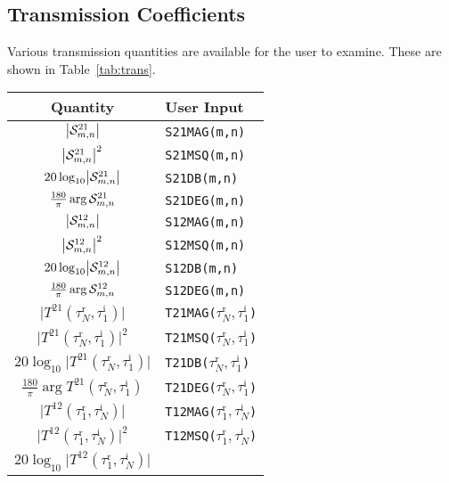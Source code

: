 \documentclass[11pt]{article}
\renewcommand{\inc}{^{\text{i}}}
\renewcommand{\refl}{^{\text{r}}}
\renewcommand{\abs}[1]{\bigl\lvert#1\bigr\rvert}
\begin{document}
\subsection{Transmission Coefficients}

Various transmission quantities are available for the user to examine.
These are shown in Table~\ref{tab:trans}.
\begin{table}[htbp]
  \begin{center}
    \renewcommand{\arraystretch}{1.3}
    \begin{tabular}{|c|l|} \hline
      \bfseries Quantity & \bfseries User Input \\ \hline \hline
      $\abs{\matel{S}^{21}_{m,n}}$ & \verb_S21MAG(m,n)_ \\ \hline
      $\abs{\matel{S}^{21}_{m,n}}^2$ & \verb_S21MSQ(m,n)_ \\ \hline
      $20\log_{10}\abs{\matel{S}^{21}_{m,n}}$ & \verb_S21DB(m,n)_ \\ \hline
      $\frac{180}{\pi}\arg{\mathcal{S}^{21}_{m,n}}$ & \verb_S21DEG(m,n)_
      \\ \hline
      $\abs{\matel{S}^{12}_{m,n}}$ & \verb_S12MAG(m,n)_ \\ \hline
      $\abs{\matel{S}^{12}_{m,n}}^2$ & \verb_S12MSQ(m,n)_ \\ \hline
      $20\log_{10}\abs{\matel{S}^{12}_{m,n}}$ & \verb_S12DB(m,n)_ \\ \hline
      $\frac{180}{\pi}\arg{\mathcal{S}^{12}_{m,n}}$ & \verb_S12DEG(m,n)_
      \\ \hline
      $\abs{T^{21}(\tau_N\refl,\tau_1\inc)}$ & 
        \verb_T21MAG(_$\tau_N\refl,\tau_1\inc$\verb_)_ \\ \hline
      $\abs{T^{21}(\tau_N\refl,\tau_1\inc)}^2$ & 
        \verb_T21MSQ(_$\tau_N\refl,\tau_1\inc$\verb_)_ \\ \hline
      $20\log_{10}\abs{T^{21}(\tau_N\refl,\tau_1\inc)}$ & 
        \verb_T21DB(_$\tau_N\refl,\tau_1\inc$\verb_)_ \\ \hline
      $\frac{180}{\pi}\arg{T^{21}(\tau_N\refl,\tau_1\inc)}$ & 
        \verb_T21DEG(_$\tau_N\refl,\tau_1\inc$\verb_)_ \\ \hline
      $\abs{T^{12}(\tau_1\refl,\tau_N\inc)}$ & 
        \verb_T12MAG(_$\tau_1\refl,\tau_N\inc$\verb_)_ \\ \hline
      $\abs{T^{12}(\tau_1\refl,\tau_N\inc)}^2$ & 
        \verb_T12MSQ(_$\tau_1\refl,\tau_N\inc$\verb_)_ \\ \hline
      $20\log_{10}\abs{T^{12}(\tau_1\refl,\tau_N\inc)}$ & 

\end{tabular}
\end{center}
\end{table}
\end{document}
